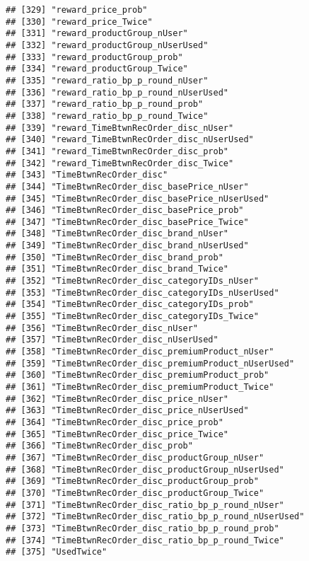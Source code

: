 \documentclass[10pt]{report}
\begin{document}
\begin{verbatim}
## [329] "reward_price_prob"                                  
## [330] "reward_price_Twice"                                 
## [331] "reward_productGroup_nUser"                          
## [332] "reward_productGroup_nUserUsed"                      
## [333] "reward_productGroup_prob"                           
## [334] "reward_productGroup_Twice"                          
## [335] "reward_ratio_bp_p_round_nUser"                      
## [336] "reward_ratio_bp_p_round_nUserUsed"                  
## [337] "reward_ratio_bp_p_round_prob"                       
## [338] "reward_ratio_bp_p_round_Twice"                      
## [339] "reward_TimeBtwnRecOrder_disc_nUser"                 
## [340] "reward_TimeBtwnRecOrder_disc_nUserUsed"             
## [341] "reward_TimeBtwnRecOrder_disc_prob"                  
## [342] "reward_TimeBtwnRecOrder_disc_Twice"                 
## [343] "TimeBtwnRecOrder_disc"                              
## [344] "TimeBtwnRecOrder_disc_basePrice_nUser"              
## [345] "TimeBtwnRecOrder_disc_basePrice_nUserUsed"          
## [346] "TimeBtwnRecOrder_disc_basePrice_prob"               
## [347] "TimeBtwnRecOrder_disc_basePrice_Twice"              
## [348] "TimeBtwnRecOrder_disc_brand_nUser"                  
## [349] "TimeBtwnRecOrder_disc_brand_nUserUsed"              
## [350] "TimeBtwnRecOrder_disc_brand_prob"                   
## [351] "TimeBtwnRecOrder_disc_brand_Twice"                  
## [352] "TimeBtwnRecOrder_disc_categoryIDs_nUser"            
## [353] "TimeBtwnRecOrder_disc_categoryIDs_nUserUsed"        
## [354] "TimeBtwnRecOrder_disc_categoryIDs_prob"             
## [355] "TimeBtwnRecOrder_disc_categoryIDs_Twice"            
## [356] "TimeBtwnRecOrder_disc_nUser"                        
## [357] "TimeBtwnRecOrder_disc_nUserUsed"                    
## [358] "TimeBtwnRecOrder_disc_premiumProduct_nUser"         
## [359] "TimeBtwnRecOrder_disc_premiumProduct_nUserUsed"     
## [360] "TimeBtwnRecOrder_disc_premiumProduct_prob"          
## [361] "TimeBtwnRecOrder_disc_premiumProduct_Twice"         
## [362] "TimeBtwnRecOrder_disc_price_nUser"                  
## [363] "TimeBtwnRecOrder_disc_price_nUserUsed"              
## [364] "TimeBtwnRecOrder_disc_price_prob"                   
## [365] "TimeBtwnRecOrder_disc_price_Twice"                  
## [366] "TimeBtwnRecOrder_disc_prob"                         
## [367] "TimeBtwnRecOrder_disc_productGroup_nUser"           
## [368] "TimeBtwnRecOrder_disc_productGroup_nUserUsed"       
## [369] "TimeBtwnRecOrder_disc_productGroup_prob"            
## [370] "TimeBtwnRecOrder_disc_productGroup_Twice"           
## [371] "TimeBtwnRecOrder_disc_ratio_bp_p_round_nUser"       
## [372] "TimeBtwnRecOrder_disc_ratio_bp_p_round_nUserUsed"   
## [373] "TimeBtwnRecOrder_disc_ratio_bp_p_round_prob"        
## [374] "TimeBtwnRecOrder_disc_ratio_bp_p_round_Twice"       
## [375] "UsedTwice"
\end{verbatim}
\end{document}

